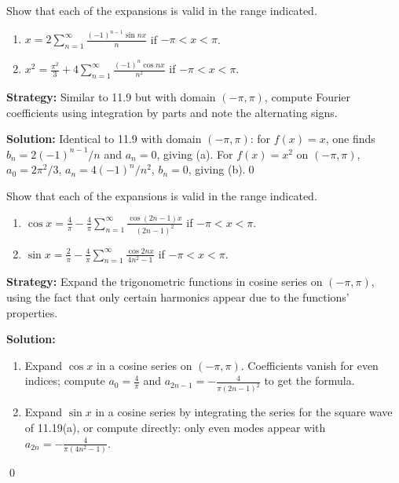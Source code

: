 \begin{problembox}
Show that each of the expansions is valid in the range indicated.
\begin{enumerate}[label=(\alph*)]
\item $x = 2 \sum_{n=1}^\infty \frac{(-1)^{n-1} \sin nx}{n}$ if $-\pi < x < \pi$.
\item $x^2 = \frac{\pi^2}{3} + 4 \sum_{n=1}^\infty \frac{(-1)^n \cos nx}{n^2}$ if $-\pi < x < \pi$.
\end{enumerate}
\end{problembox}

\noindent\textbf{Strategy:} Similar to 11.9 but with domain $(-\pi,\pi)$, compute Fourier coefficients using integration by parts and note the alternating signs.

\bigskip\noindent\textbf{Solution:}
Identical to 11.9 with domain $(-\pi,\pi)$: for $f(x)=x$, one finds $b_n=2(-1)^{n-1}/n$ and $a_n=0$, giving (a). For $f(x)=x^2$ on $(-\pi,\pi)$, $a_0=2\pi^2/3$, $a_n=4(-1)^n/n^2$, $b_n=0$, giving (b).\qed


\begin{problembox}
Show that each of the expansions is valid in the range indicated.
\begin{enumerate}[label=(\alph*)]
\item $\cos x = \frac{4}{\pi} - \frac{4}{\pi} \sum_{n=1}^\infty \frac{\cos (2n - 1)x}{(2n - 1)^2}$ if $-\pi < x < \pi$.
\item $\sin x = \frac{2}{\pi} - \frac{4}{\pi} \sum_{n=1}^\infty \frac{\cos 2nx}{4n^2 - 1}$ if $-\pi < x < \pi$.
\end{enumerate}
\end{problembox}

\noindent\textbf{Strategy:} Expand the trigonometric functions in cosine series on $(-\pi,\pi)$, using the fact that only certain harmonics appear due to the functions' properties.

\bigskip\noindent\textbf{Solution:}
\begin{enumerate}[label=(\alph*)]
\item Expand $\cos x$ in a cosine series on $(-\pi,\pi)$. Coefficients vanish for even indices; compute $a_0=\tfrac{4}{\pi}$ and $a_{2n-1}=-\tfrac{4}{\pi(2n-1)^2}$ to get the formula.
\item Expand $\sin x$ in a cosine series by integrating the series for the square wave of 11.19(a), or compute directly: only even modes appear with $a_{2n}= -\tfrac{4}{\pi(4n^2-1)}$.
\end{enumerate}\qed


